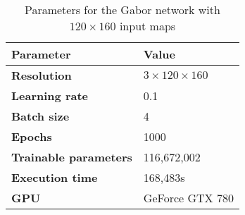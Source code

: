 \begin{table}[h!]
	\footnotesize
	\centering
	\begin{tabular}{ll}
	\hline
		\textbf{Parameter} & \textbf{Value}\\
	\hline
	\hline
		\textbf{Resolution} & $3 \times 120\times160$\\
		\textbf{Learning rate} & 0.1\\
		\textbf{Batch size} & 4\\
		\textbf{Epochs} & 1000\\
		\textbf{Trainable parameters} & 116,672,002\\
		\textbf{Execution time} & 168,483s\\
		\textbf{GPU} & GeForce GTX 780\\
	\hline
	\end{tabular}
	\caption{Parameters for the Gabor network with $120\times160$ input maps}
	\label{tab:gabor_params_120}
\end{table}
